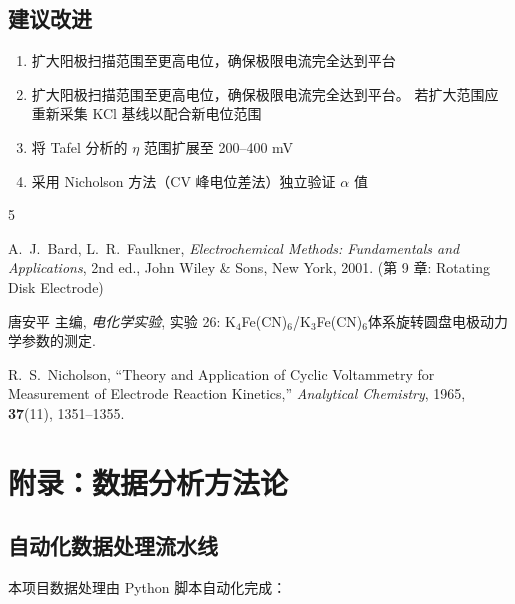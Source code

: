 \documentclass[12pt,a4paper]{ctexart}
\begin{document}
\subsection{建议改进}

\begin{enumerate}[leftmargin=1.5cm]
  \item 扩大阳极扫描范围至更高电位，确保极限电流完全达到平台
  \item 扩大阳极扫描范围至更高电位，确保极限电流完全达到平台。
  若扩大范围应重新采集 KCl 基线以配合新电位范围
  \item 将 Tafel 分析的 $\eta$ 范围扩展至 200--400 mV
  \item 采用 Nicholson 方法（CV 峰电位差法）独立验证 $\alpha$ 值
\end{enumerate}

\newpage

\begin{thebibliography}{5}

A.~J.~Bard, L.~R.~Faulkner,
\textit{Electrochemical Methods: Fundamentals and Applications}, 2nd ed.,
John Wiley \& Sons, New York, 2001. (第 9 章: Rotating Disk Electrode)

唐安平 主编,
\textit{电化学实验},
实验 26: K$_4$Fe(CN)$_6$/K$_3$Fe(CN)$_6$体系旋转圆盘电极动力学参数的测定.

R.~S.~Nicholson,
``Theory and Application of Cyclic Voltammetry for Measurement of Electrode Reaction Kinetics,''
\textit{Analytical Chemistry}, 1965, \textbf{37}(11), 1351--1355.

\end{thebibliography}

\newpage

\appendix
\section{附录：数据分析方法论}

\subsection{自动化数据处理流水线}

本项目数据处理由 Python 脚本自动化完成：
\end{document}
